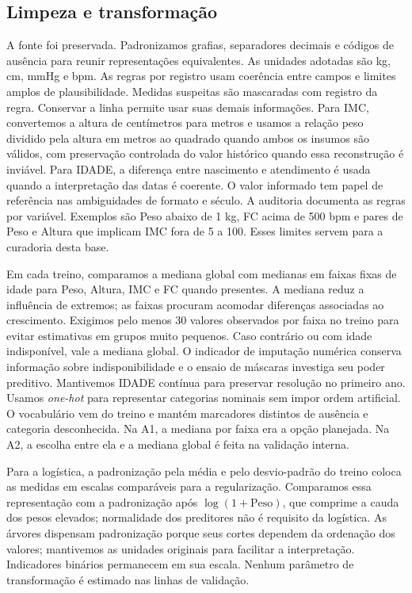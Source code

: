 \subsection{Limpeza e transformação}
A fonte foi preservada. Padronizamos grafias, separadores decimais e códigos de ausência para reunir representações equivalentes. As unidades adotadas são kg, cm, mmHg e bpm. As regras por registro usam coerência entre campos e limites amplos de plausibilidade. Medidas suspeitas são mascaradas com registro da regra. Conservar a linha permite usar suas demais informações. Para IMC, convertemos a altura de centímetros para metros e usamos a relação peso dividido pela altura em metros ao quadrado quando ambos os insumos são válidos, com preservação controlada do valor histórico quando essa reconstrução é inviável. Para IDADE, a diferença entre nascimento e atendimento é usada quando a interpretação das datas é coerente. O valor informado tem papel de referência nas ambiguidades de formato e século. A auditoria documenta as regras por variável. Exemplos são Peso abaixo de 1 kg, FC acima de 500 bpm e pares de Peso e Altura que implicam IMC fora de 5 a 100. Esses limites servem para a curadoria desta base.

Em cada treino, comparamos a mediana global com medianas em faixas fixas de idade para Peso, Altura, IMC e FC quando presentes. A mediana reduz a influência de extremos; as faixas procuram acomodar diferenças associadas ao crescimento. Exigimos pelo menos 30 valores observados por faixa no treino para evitar estimativas em grupos muito pequenos. Caso contrário ou com idade indisponível, vale a mediana global. O indicador de imputação numérica conserva informação sobre indisponibilidade e o ensaio de máscaras investiga seu poder preditivo. Mantivemos IDADE contínua para preservar resolução no primeiro ano. Usamos \textit{one-hot} para representar categorias nominais sem impor ordem artificial. O vocabulário vem do treino e mantém marcadores distintos de ausência e categoria desconhecida. Na A1, a mediana por faixa era a opção planejada. Na A2, a escolha entre ela e a mediana global é feita na validação interna.

Para a logística, a padronização pela média e pelo desvio-padrão do treino coloca as medidas em escalas comparáveis para a regularização. Comparamos essa representação com a padronização após \(\log(1+\text{Peso})\), que comprime a cauda dos pesos elevados; normalidade dos preditores não é requisito da logística. As árvores dispensam padronização porque seus cortes dependem da ordenação dos valores; mantivemos as unidades originais para facilitar a interpretação. Indicadores binários permanecem em sua escala. Nenhum parâmetro de transformação é estimado nas linhas de validação.

